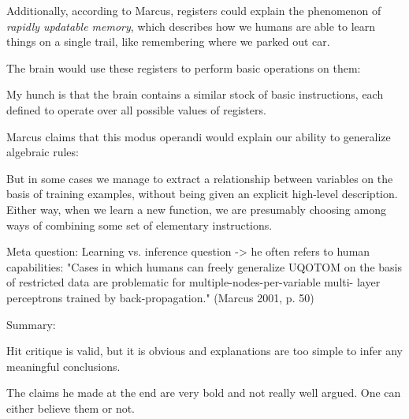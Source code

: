 \documentclass[../../main.tex]{subfiles}
\begin{document}
Additionally, according to Marcus, registers could explain the phenomenon of \emph{rapidly updatable memory}, which describes how we humans are able to learn things on a single trail, like remembering where we parked out car.

The brain would use these registers to perform basic operations on them:

\begin{citecallout}
    My hunch
    is that the brain contains a similar stock of basic instructions, each defined to operate over all possible values of registers.
\end{citecallout}

Marcus claims that this modus operandi would explain our ability to generalize algebraic rules:

\begin{citecallout}
    But in some cases we manage to extract a relationship between
    variables on the basis of training examples, without being given an explicit high-level description. Either way, when we learn a new function,
    we are presumably choosing among ways of combining some set of
    elementary instructions.
\end{citecallout}




Meta question:
Learning vs. inference question
-> he often refers to human capabilities:
"Cases in which humans can freely generalize UQOTOM on the basis of
restricted data are problematic for multiple-nodes-per-variable multi-
layer perceptrons trained by back-propagation." (Marcus 2001, p. 50)

Summary:

Hit critique is valid, but it is obvious and explanations are too simple to infer any meaningful conclusions.

The claims he made at the end are very bold and not really well argued. One can either believe them or not.
\end{document}
